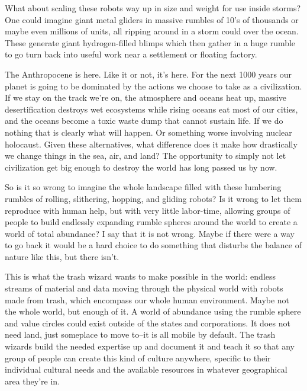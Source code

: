 What about scaling these robots way up in size and weight for use inside
storms? One could imagine giant metal gliders in massive rumbles of 10's
of thousands or maybe even millions of units, all ripping around in a
storm could over the ocean. These generate giant hydrogen-filled blimps
which then gather in a huge rumble to go turn back into useful work near
a settlement or floating factory.

The Anthropocene is here. Like it or not, it's here. For the next 1000
years our planet is going to be dominated by the actions we choose to
take as a civilization. If we stay on the track we're on, the atmosphere
and oceans heat up, massive desertification destroys wet ecosystems
while rising oceans eat most of our cities, and the oceans become a
toxic waste dump that cannot sustain life. If we do nothing that is
clearly what will happen. Or something worse involving nuclear
holocaust. Given these alternatives, what difference does it make how
drastically we change things in the sea, air, and land? The opportunity
to simply not let civilization get big enough to destroy the world has
long passed us by now.

So is it so wrong to imagine the whole landscape filled with these
lumbering rumbles of rolling, slithering, hopping, and gliding robots?
Is it wrong to let them reproduce with human help, but with very little
labor-time, allowing groups of people to build endlessly expanding
rumble spheres around the world to create a world of total abundance? I
say that it is not wrong. Maybe if there were a way to go back it would
be a hard choice to do something that disturbs the balance of nature
like this, but there isn't.

This is what the trash wizard wants to make possible in the world:
endless streams of material and data moving through the physical world
with robots made from trash, which encompass our whole human
environment. Maybe not the whole world, but enough of it. A world of
abundance using the rumble sphere and value circles could exist outside
of the states and corporations. It does not need land, just someplace to
move to--it is all mobile by default. The trash wizards build the needed
expertise up and document it and teach it so that any group of people
can create this kind of culture anywhere, specific to their individual
cultural needs and the available resources in whatever geographical area
they're in.
